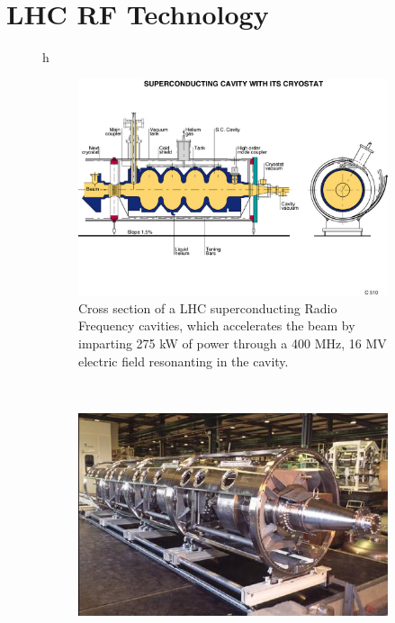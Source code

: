 \section{LHC RF Technology}
\label{lhc_rf_overview}

\begin{figure}{h}
    \centering
    \begin{subfigure}[h]{0.450\textwidth}
        \includegraphics[width=\textwidth]{Figures/LHC_Diagrams/LHC_RFCavity_Schematic-1994-006.jpg}
        \caption{Cross section of a LHC superconducting Radio
          Frequency cavities, which accelerates the beam by imparting
          275 kW of power through a 400 MHz, 16 MV electric field
          resonanting in the cavity.}\label{fig:lhc_rf_xs}
      \end{subfigure}
      ~ %
    \begin{subfigure}[h]{0.450\textwidth}
        \includegraphics[width=\textwidth]{Figures/LHC_Diagrams/LHC_RFCavity_Staged.jpg}

\end{subfigure}
\end{figure}
